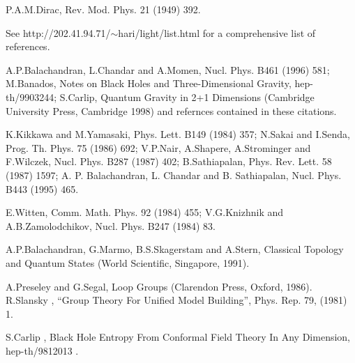 \documentclass[a4paper,12pt]{article}
\begin{document}
\newpage


\begin{thebibliography}{99}

 P.A.M.Dirac, Rev. Mod. Phys. 21 (1949) 392.

 See http://202.41.94.71/$\sim$hari/light/list.html for a
comprehensive list of references.

A.P.Balachandran, L.Chandar and A.Momen, Nucl. Phys. B461 (1996) 581; 
M.Banados, Notes on Black Holes and Three-Dimensional Gravity, hep-th/9903244; 
S.Carlip, Quantum Gravity in 2+1 Dimensions (Cambridge University
Press, Cambridge 1998) and refernces contained in these citations.

K.Kikkawa and M.Yamasaki, Phys. Lett. B149 (1984) 357;
N.Sakai and I.Senda, Prog. Th. Phys. 75 (1986) 692;
V.P.Nair, A.Shapere, A.Strominger and F.Wilczek, Nucl. Phys. 
B287 (1987) 402; B.Sathiapalan, Phys. Rev. Lett. 58 (1987) 1597;
A. P. Balachandran, L. Chandar and B. Sathiapalan, Nucl. Phys. B443 
(1995) 465.

 E.Witten, Comm. Math. Phys. 92 (1984) 455;
V.G.Knizhnik and A.B.Zamolodchikov, Nucl. Phys. B247 (1984) 83.

 A.P.Balachandran, G.Marmo, B.S.Skagerstam and A.Stern,
Classical Topology and Quantum States (World Scientific, Singapore, 1991).

 A.Preseley and G.Segal, Loop Groups (Clarendon
Press, Oxford, 1986).
R.Slansky , ``Group Theory For
 Unified Model Building'', Phys. Rep. 79, (1981) 1.

 S.Carlip , Black Hole Entropy From Conformal Field Theory
 In Any Dimension, hep-th/9812013 .
\end{thebibliography}
\end{document}
